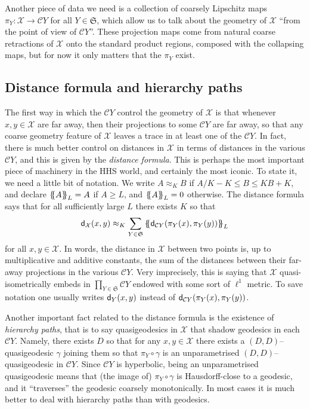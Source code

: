 \documentclass[11pt,oneside]{amsart}
\theoremstyle{definition}
\newcommand{\tsh}[1]{\left\{\kern-.7ex\left\{#1\right\}\kern-.7ex\right\}}
\newcommand{\Tsh}[2]{\tsh{#2}_{#1}}
\newcommand{\ignore}[2]{\Tsh{#2}{#1}}
\newcommand{\dist}{\textup{\textsf{d}}}
\newcommand{\cuco}[1]{{\mathcal #1}}
\newcommand{\fontact}{{\mathcal C}}
\begin{document}
Another piece of data we need is a collection of coarsely Lipschitz maps $\pi_Y:\cuco X\to\fontact Y$ for all $Y\in\mathfrak S$, which allow us to talk about the geometry of $\cuco X$ ``from the point of view of $\fontact Y$''. These projection maps come from natural coarse retractions of $\cuco X$ onto the standard product regions, composed with the collapsing maps, but for now it only matters that the $\pi_Y$ exist. 

\subsection{Distance formula and hierarchy paths}
The first way in which the $\fontact Y$ control the geometry of $\cuco X$ is that whenever $x,y\in\cuco X$ are far away, then their projections to some $\fontact Y$ are far away, so that any coarse geometry feature of $\cuco X$ leaves a trace in at least one of the $\fontact Y$. In fact, there is much better control on distances in $\cuco X$ in terms of distances in the various $\fontact Y$, and this is given by the \emph{distance formula}. This is perhaps the most important piece of machinery in the HHS world, and certainly the most iconic. To state it, we need a little bit of notation. We write $A\approx_K B$ if $A/K-K\leq B\leq KB+K$, and declare $\ignore{A}{L}=A$ if $A\geq L$, and $\ignore{A}{L}=0$ otherwise. The distance formula says that for all sufficiently large $L$ there exists $K$ so that
$$\dist_{\cuco X}(x,y)\approx_K \sum_{Y\in\mathfrak S} \ignore{\dist_{\fontact Y}(\pi_Y(x),\pi_Y(y))}{L}$$
for all $x,y\in\cuco X$. In words, the distance in $\cuco X$ between two points is, up to multiplicative and additive constants, the sum of the distances between their far-away projections in the various $\fontact Y$. Very imprecisely, this is saying that $\cuco X$ quasi-isometrically embeds in $\prod_{Y\in\mathfrak S} \fontact Y$ endowed with some sort of $\ell^1$ metric. To save notation one usually writes $\dist_Y(x,y)$ instead of $\dist_{\fontact Y}(\pi_Y(x),\pi_Y(y))$.

Another important fact related to the distance formula is the existence of \emph{hierarchy paths}, that is to say quasigeodesics in $\cuco X$ that shadow geodesics in each $\fontact Y$. Namely, there exists $D$ so that for any $x,y\in\cuco X$ there exists a $(D,D)$--quasigeodesic $\gamma$ joining them so that $\pi_Y\circ\gamma$ is an unparametrised $(D,D)$--quasigeodesic in $\fontact Y$. Since $\fontact Y$ is hyperbolic, being an unparametrised quasigeodesic means that (the image of) $\pi_Y\circ\gamma$ is Hausdorff-close to a geodesic, and it ``traverses'' the geodesic coarsely monotonically. In most cases it is much better to deal with hierarchy paths than with geodesics.
\end{document}
